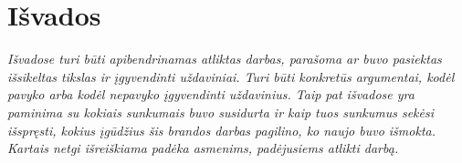 \newpage
\section{Išvados}
\textit{Išvadose turi būti apibendrinamas atliktas darbas, parašoma ar buvo pasiektas išsikeltas tikslas ir įgyvendinti uždaviniai. Turi būti konkretūs argumentai, kodėl pavyko arba kodėl nepavyko įgyvendinti uždavinius. Taip pat išvadose yra paminima su kokiais sunkumais buvo susidurta ir kaip tuos sunkumus sekėsi išspręsti, kokius įgūdžius šis brandos darbas pagilino, ko naujo buvo išmokta. Kartais netgi išreiškiama padėka asmenims, padėjusiems atlikti darbą.}\par
\lipsum[6]